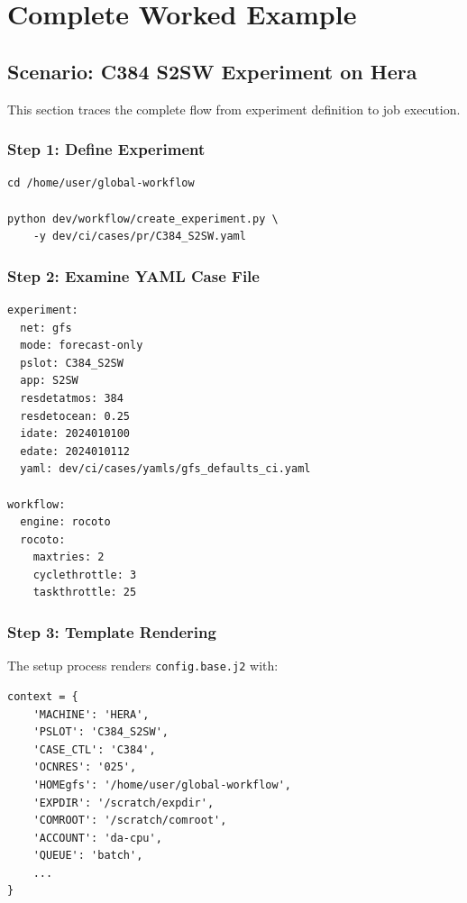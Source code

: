 \documentclass[11pt,letterpaper]{article}
\begin{document}

\section{Complete Worked Example}

\subsection{Scenario: C384 S2SW Experiment on Hera}

This section traces the complete flow from experiment definition to job execution.

\subsubsection{Step 1: Define Experiment}

\begin{lstlisting}[style=bashstyle, title=Create Experiment]
cd /home/user/global-workflow

python dev/workflow/create_experiment.py \
    -y dev/ci/cases/pr/C384_S2SW.yaml
\end{lstlisting}

\subsubsection{Step 2: Examine YAML Case File}

\begin{lstlisting}[style=yamlstyle, title=C384\_S2SW.yaml]
experiment:
  net: gfs
  mode: forecast-only
  pslot: C384_S2SW
  app: S2SW
  resdetatmos: 384
  resdetocean: 0.25
  idate: 2024010100
  edate: 2024010112
  yaml: dev/ci/cases/yamls/gfs_defaults_ci.yaml

workflow:
  engine: rocoto
  rocoto:
    maxtries: 2
    cyclethrottle: 3
    taskthrottle: 25
\end{lstlisting}

\subsubsection{Step 3: Template Rendering}

The setup process renders \texttt{config.base.j2} with:

\begin{lstlisting}[style=pythonstyle, title=Rendering Context]
context = {
    'MACHINE': 'HERA',
    'PSLOT': 'C384_S2SW',
    'CASE_CTL': 'C384',
    'OCNRES': '025',
    'HOMEgfs': '/home/user/global-workflow',
    'EXPDIR': '/scratch/expdir',
    'COMROOT': '/scratch/comroot',
    'ACCOUNT': 'da-cpu',
    'QUEUE': 'batch',
    ...
}
\end{lstlisting}
\end{document}
